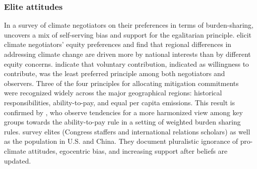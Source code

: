 \subsubsection{Elite attitudes}\label{subsubsec:literature_beliefs} %

In a survey of climate negotiators on their preferences in terms of burden-sharing,  uncovers a mix of self-serving bias and support for the egalitarian principle.  elicit climate negotiators' equity preferences and find that regional differences in addressing climate change are driven more by national interests than by different equity concerns.  indicate that voluntary contribution, indicated as willingness to contribute, was the least preferred principle among both negotiators and observers. Three of the four principles for allocating mitigation commitments were recognized widely across the major geographical regions: historical responsibilities, ability-to-pay, and equal per capita emissions. This result is confirmed by , who observe tendencies for a more harmonized view among key groups towards the ability-to-pay rule in a setting of weighted burden sharing rules.  survey elites (Congress staffers and international relations scholars) as well as the population in U.S. and China. They document pluralistic ignorance of pro-climate attitudes, egocentric bias, and increasing support after beliefs are updated. 

